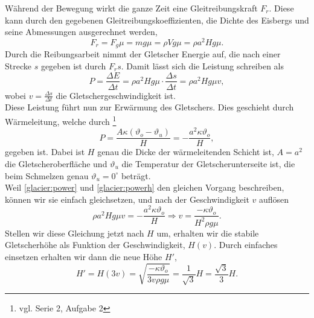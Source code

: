 \begin{Answer}[ref = glacier]
	Während der Bewegung wirkt die ganze Zeit eine Gleitreibungskraft $F_r$. Diese kann durch den gegebenen Gleitreibungskoeffizienten, die Dichte des Eisbergs und seine Abmessungen ausgerechnet werden,
	\begin{equation}\label{glacier:friction}
		F_r = F_g\mu = mg\mu = \rho V g\mu = \rho a^2Hg\mu.
	\end{equation}
Durch die Reibungsarbeit nimmt der Gletscher Energie auf, die nach einer Strecke $s$ gegeben ist durch $F_rs$. Damit lässt sich die Leistung schreiben als
\begin{equation}\label{glacier:power}
	P = \frac{\Delta E}{\Delta t} = \rho a^2 H g\mu \cdot \frac{\Delta s}{\Delta t} = \rho a^2 H g\mu v,
\end{equation}
wobei $v=\frac{\Delta s}{\Delta t}$ die Gletschergeschwindigkeit ist.\\
Diese Leistung führt nun zur Erwärmung des Gletschers. Dies geschieht durch Wärmeleitung, welche durch \footnote[2]{vgl. Serie 2, Aufgabe 2}
\begin{equation}\label{glacier:powerh}
	P = \frac{A\kappa \left(\vartheta_o-\vartheta_u\right)}{H} =- \frac{a^2\kappa \vartheta_o}{H},
\end{equation}
gegeben ist.
Dabei ist $H$ genau die Dicke der wärmeleitenden Schicht ist, $A =a^2$ die Gletscheroberfläche und $\vartheta_u$ die Temperatur der Gletscherunterseite ist, die beim Schmelzen genau $\vartheta_u = 0^\circ$ beträgt. \\
Weil \eqref{glacier:power} und \eqref{glacier:powerh} den gleichen Vorgang beschreiben, können wir sie einfach gleichsetzen, und nach der Geschwindigkeit $v$ auflösen
\begin{equation}\label{glacier:vel}
	\boxed{ \rho a^2 H g\mu v = - \frac{a^2\kappa \vartheta_o}{H} \Rightarrow v = \frac{-\kappa \vartheta_o}{H^2\rho g\mu }.}
\end{equation} 
Stellen wir diese Gleichung jetzt nach $H$ um, erhalten wir die stabile Gletscherhöhe als Funktion der Geschwindigkeit, $H\left(v\right)$. Durch einfaches einsetzen erhalten wir dann die neue Höhe $H'$,
\begin{equation}
	\boxed{
		H' = H\left(3v\right) = \sqrt{\frac{-\kappa \vartheta_o}{3v\rho g \mu}} = \frac{1}{\sqrt{3}} H = \frac{\sqrt{3}}{3}H.
		}
\end{equation}
\end{Answer}